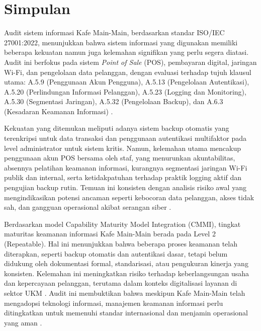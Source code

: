 \documentclass[12pt, a4paper]{report}
\begin{document}
\section{Simpulan}
Audit sistem informasi Kafe Main-Main, berdasarkan standar ISO/IEC 27001:2022, menunjukkan bahwa sistem informasi yang digunakan memiliki beberapa kekuatan namun juga kelemahan signifikan yang perlu segera diatasi. Audit ini berfokus pada sistem \textit{Point of Sale} (POS), pembayaran digital, jaringan Wi-Fi, dan pengelolaan data pelanggan, dengan evaluasi terhadap tujuh klausul utama: A.5.9 (Penggunaan Akun Pengguna), A.5.13 (Pengelolaan Autentikasi), A.5.20 (Perlindungan Informasi Pelanggan), A.5.23 (Logging dan Monitoring), A.5.30 (Segmentasi Jaringan), A.5.32 (Pengelolaan Backup), dan A.6.3 (Kesadaran Keamanan Informasi) \citep{iso27001, auditkafe2025}.

Kekuatan yang ditemukan meliputi adanya sistem backup otomatis yang terenkripsi untuk data transaksi dan penggunaan autentikasi multifaktor pada level administrator untuk sistem kritis. Namun, kelemahan utama mencakup penggunaan akun POS bersama oleh staf, yang menurunkan akuntabilitas, absennya pelatihan keamanan informasi, kurangnya segmentasi jaringan Wi-Fi publik dan internal, serta ketidakpatuhan terhadap praktik logging aktif dan pengujian backup rutin. Temuan ini konsisten dengan analisis risiko awal yang mengindikasikan potensi ancaman seperti kebocoran data pelanggan, akses tidak sah, dan gangguan operasional akibat serangan siber \citep{widodo2022keamanan, haryanto2021wifi, sari2023backup}.

Berdasarkan model Capability Maturity Model Integration (CMMI), tingkat maturitas keamanan informasi Kafe Main-Main berada pada Level 2 (Repeatable). Hal ini menunjukkan bahwa beberapa proses keamanan telah diterapkan, seperti backup otomatis dan autentikasi dasar, tetapi belum didukung oleh dokumentasi formal, standarisasi, atau pengukuran kinerja yang konsisten. Kelemahan ini meningkatkan risiko terhadap keberlangsungan usaha dan kepercayaan pelanggan, terutama dalam konteks digitalisasi layanan di sektor UKM \citep{permatasari2023manajemen, ratnasari2021pelindungan}. Audit ini membuktikan bahwa meskipun Kafe Main-Main telah mengadopsi teknologi informasi, manajemen keamanan informasi perlu ditingkatkan untuk memenuhi standar internasional dan menjamin operasional yang aman \cite{frangky2024implementasi}.
\end{document}
